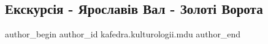  
 
 
 
 

\subsection{Екскурсія - Ярославів Вал - Золоті Ворота}
\label{sec:29_04_2023.fb.kafedra.kulturologii.mdu.1.ekskursia_jaroslaviv_val_zoloti_vorota}

\ifcmt
 author_begin
   author_id kafedra.kulturologii.mdu
 author_end
\fi
